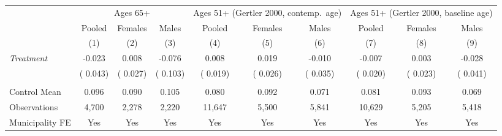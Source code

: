 \begin{tabular}{lccccccccc} \hline \hline
& \multicolumn{3}{c}{Ages 65+} & \multicolumn{3}{c}{Ages 51+ (Gertler 2000, contemp.\ age)} & \multicolumn{3}{c}{Ages 51+ (Gertler 2000, baseline age)} \\ \cmidrule(lr){2-4}\cmidrule(lr){5-7}\cmidrule(lr){8-10}
& \multicolumn{1}{c}{Pooled} & \multicolumn{1}{c}{Females} & \multicolumn{1}{c}{Males} & \multicolumn{1}{c}{Pooled} & \multicolumn{1}{c}{Females} & \multicolumn{1}{c}{Males} & \multicolumn{1}{c}{Pooled} & \multicolumn{1}{c}{Females} & \multicolumn{1}{c}{Males} \\ 
\cmidrule(lr){2-2}\cmidrule(lr){3-3}\cmidrule(lr){4-4}\cmidrule(lr){5-5}\cmidrule(lr){6-6}\cmidrule(lr){7-7}\cmidrule(lr){8-8}\cmidrule(lr){9-9}\cmidrule(lr){10-10}
& \multicolumn{1}{c}{(1)} & \multicolumn{1}{c}{(2)} & \multicolumn{1}{c}{(3)} & \multicolumn{1}{c}{(4)} & \multicolumn{1}{c}{(5)} & \multicolumn{1}{c}{(6)} & \multicolumn{1}{c}{(7)} & \multicolumn{1}{c}{(8)} & \multicolumn{1}{c}{(9)} \\ \toprule
\textit{Treatment} & -0.023 & 0.008 & -0.076 & 0.008 & 0.019 & -0.010 & -0.007 & 0.003 & -0.028 \\ 
 & (    0.043) & (    0.027) & (    0.103) & (    0.019) & (    0.026) & (    0.035) & (    0.020) & (    0.023) & (    0.041) \\ 
  & & & & & & & & & \\ 
Control Mean &     0.096 &     0.090 &     0.105 &     0.080 &     0.092 &     0.071 &     0.081 &     0.093 &     0.069 \\ 
Observations &        4,700 &        2,278 &        2,220 &       11,647 &        5,500 &        5,841 &       10,629 &        5,205 &        5,418 \\ 
Municipality FE & Yes & Yes & Yes & Yes & Yes & Yes & Yes & Yes & Yes \\ \bottomrule
\end{tabular}